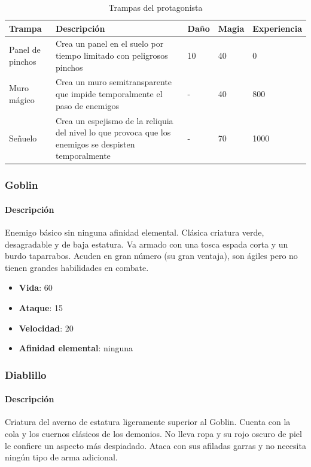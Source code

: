 \begin{table}[H]
    \centering
        \begin{tabular}{| p{2.7cm} | p{7cm} | p{2cm} | p{2cm} | p{2cm} |}
            \hline
            \textbf{Trampa} & \textbf{Descripción} & \textbf{Daño} & \textbf{Magia} & \textbf{Experiencia}\\
            \hline
            Panel de pinchos & Crea un panel en el suelo por tiempo limitado con peligrosos pinchos & 10 & 40 & 0  \\
			\hline
            Muro mágico & Crea un muro semitransparente que impide temporalmente el paso de enemigos & - & 40 & 800  \\
			\hline
            Señuelo & Crea un espejismo de la reliquia del nivel lo que provoca que los enemigos se despisten temporalmente & - & 70 & 1000  \\
			\hline
        \end{tabular}
    \caption{Trampas del protagonista}
    \label{tab:trampas}
\end{table}

\subsubsection{Goblin}

\paragraph{Descripción}
Enemigo básico sin ninguna afinidad elemental. Clásica criatura verde, desagradable
y de baja estatura. Va armado con una tosca espada corta y un burdo taparrabos.
Acuden en gran número (su gran ventaja), son ágiles pero no tienen grandes
habilidades en combate.

\begin{itemize}
    \item \textbf{Vida}: 60
    \item \textbf{Ataque}: 15
    \item \textbf{Velocidad}: 20
    \item \textbf{Afinidad elemental}: ninguna
\end{itemize}

\subsubsection{Diablillo}

\paragraph{Descripción}
Criatura del averno de estatura ligeramente superior al Goblin. Cuenta con
la cola y los cuernos clásicos de los demonios. No lleva ropa y su rojo
oscuro de piel le confiere un aspecto más despiadado. Ataca con sus afiladas
garras y no necesita ningún tipo de arma adicional.

